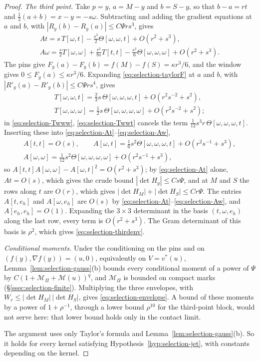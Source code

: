 \begin{proof}
\emph{The third point.} Take $p=y$, $a=M-y$ and $b=S-y$, so that $b-a=rt$ and $\frac12(a+b)=x-y=-s\omega$. Subtracting and adding the gradient equations at $a$ and $b$, with $|R_y(b)-R_y(a)|\le C\Psi rs^3$, gives
\begin{gather}
At=s\,T[\omega,t]-\tfrac{s^2}2\Theta[\omega,\omega,t]+O(r^2+s^3),\label{eq:selection-At}\\
A\omega=\tfrac s2T[\omega,\omega]+\tfrac{r^2}{8s}T[t,t]-\tfrac{s^2}6\Theta[\omega,\omega,\omega]+O(r^2+s^3).\label{eq:selection-Aw}
\end{gather}
The pins give $F_y(a)-F_y(b)=f(M)-f(S)=\kappa r^3/6$, and the window gives $0\le F_y(a)\le\kappa r^3/6$. Expanding \eqref{eq:selection-taylorF} at $a$ and $b$, with $|R'_y(a)-R'_y(b)|\le C\Psi rs^4$, gives
\begin{gather}
T[\omega,\omega,t]=\tfrac23s\,\Theta[\omega,\omega,\omega,t]+O(r^2s^{-2}+s^2),\label{eq:selection-Twwt}\\
T[\omega,\omega,\omega]=\tfrac12s\,\Theta[\omega,\omega,\omega,\omega]+O(r^2s^{-2}+s^2);\label{eq:selection-Twww}
\end{gather}
in \eqref{eq:selection-Twww}, \eqref{eq:selection-Twwt} cancels the term $\frac1{12}s^3r\,\Theta[\omega,\omega,\omega,t]$. Inserting these into \eqref{eq:selection-At}--\eqref{eq:selection-Aw},
\begin{gather*}
A[t,t]=O(s),\qquad A[\omega,t]=\tfrac16s^2\Theta[\omega,\omega,\omega,t]+O(r^2s^{-1}+s^3),\\
A[\omega,\omega]=\tfrac1{12}s^2\Theta[\omega,\omega,\omega,\omega]+O(r^2s^{-1}+s^3),
\end{gather*}
so $A[t,t]A[\omega,\omega]-A[\omega,t]^2=O(r^2+s^3)$; by \eqref{eq:selection-At} alone, $At=O(s)$, which gives the crude bound $|\det H_y|\le Cs\Psi$, and at $M$ and $S$ the rows along $t$ are $O(r)$, which gives $|\det H_M|+|\det H_S|\le Cr\Psi$. The entries $A[t,e_h]$ and $A[\omega,e_h]$ are $O(s)$ by \eqref{eq:selection-At}--\eqref{eq:selection-Aw}, and $A[e_h,e_h]=O(1)$. Expanding the $3\times3$ determinant in the basis $(t,\omega,e_h)$ along the last row, every term is $O(r^2+s^3)$. The Gram determinant of this basis is $\rho^2$, which gives \eqref{eq:selection-thirdenv}.

\emph{Conditional moments.} Under the conditioning on the pins and on $(f(y),\nabla f(y))=(u,0)$, equivalently on $V=v^*(u)$, Lemma~\ref{lem:selection-gauss}(b) bounds every conditional moment of a power of $\Psi$ by $C(1+\mathcal M_\Pi+\mathcal M(u))^q$, and $\mathcal M_\Pi$ is bounded on compact marks (\S\ref{ssec:selection-finite}). Multiplying the three envelopes, with $W_r\le|\det H_M|\,|\det H_S|$, gives \eqref{eq:selection-envelope}. A bound of these moments by a power of $1+\rho^{-1}$, through a lower bound $\rho^{10}$ for the third-point block, would not serve here: that lower bound holds only in the contact limit.

The argument uses only Taylor's formula and Lemma~\ref{lem:selection-gauss}(b). So it holds for every kernel satisfying Hypothesis~\ref{hyp:selection-jet}, with constants depending on the kernel.
\end{proof}

